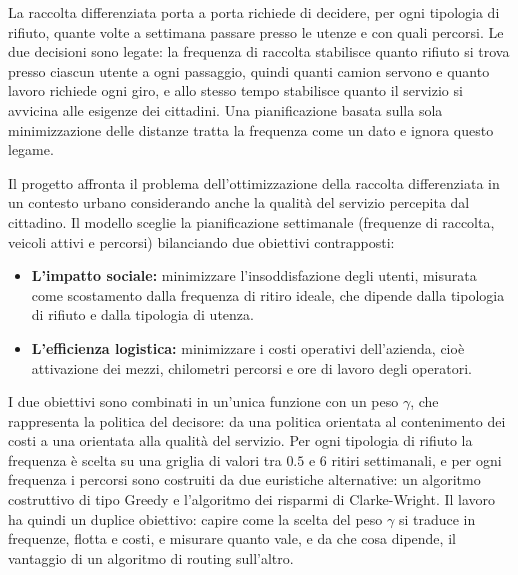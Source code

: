 \noindent
La raccolta differenziata porta a porta richiede di decidere, per ogni tipologia di rifiuto, quante volte a settimana passare presso le utenze e con quali percorsi. Le due decisioni sono legate: la frequenza di raccolta stabilisce quanto rifiuto si trova presso ciascun utente a ogni passaggio, quindi quanti camion servono e quanto lavoro richiede ogni giro, e allo stesso tempo stabilisce quanto il servizio si avvicina alle esigenze dei cittadini. Una pianificazione basata sulla sola minimizzazione delle distanze tratta la frequenza come un dato e ignora questo legame.

\medskip\noindent
Il progetto affronta il problema dell'ottimizzazione della raccolta differenziata in un contesto urbano considerando anche la qualità del servizio percepita dal cittadino. Il modello sceglie la pianificazione settimanale (frequenze di raccolta, veicoli attivi e percorsi) bilanciando due obiettivi contrapposti:

\begin{itemize}
	\item \textbf{L'impatto sociale:} minimizzare l'insoddisfazione degli utenti, misurata come scostamento dalla frequenza di ritiro ideale, che dipende dalla tipologia di rifiuto e dalla tipologia di utenza.
	\item \textbf{L'efficienza logistica:} minimizzare i costi operativi dell'azienda, cioè attivazione dei mezzi, chilometri percorsi e ore di lavoro degli operatori.
\end{itemize}

\noindent
I due obiettivi sono combinati in un'unica funzione con un peso $\gamma$, che rappresenta la politica del decisore: da una politica orientata al contenimento dei costi a una orientata alla qualità del servizio. Per ogni tipologia di rifiuto la frequenza è scelta su una griglia di valori tra $0.5$ e $6$ ritiri settimanali, e per ogni frequenza i percorsi sono costruiti da due euristiche alternative: un algoritmo costruttivo di tipo Greedy e l'algoritmo dei risparmi di Clarke-Wright. Il lavoro ha quindi un duplice obiettivo: capire come la scelta del peso $\gamma$ si traduce in frequenze, flotta e costi, e misurare quanto vale, e da che cosa dipende, il vantaggio di un algoritmo di routing sull'altro.

